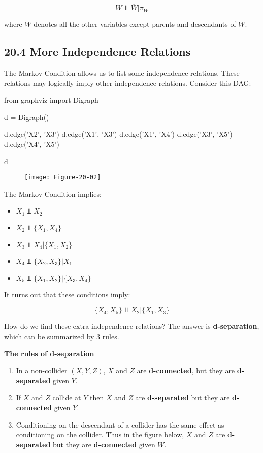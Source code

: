 \[W \text{ ⫫ } \overline{W} | \pi_W \]

where \(\overline{W}\) denotes all the other variables except parents
and descendants of \(W\).

\subsection*{20.4 More Independence Relations}\label{more-independence-relations}

The Markov Condition allows us to list some independence relations.
These relations may logically imply other independence relations.
Consider this DAG:

\begin{python}
from graphviz import Digraph

d = Digraph()

d.edge('X2', 'X3')
d.edge('X1', 'X3')
d.edge('X1', 'X4')
d.edge('X3', 'X5')
d.edge('X4', 'X5')

d
\end{python}
 
\begin{figure}[H]
\centering
\texttt{[image: Figure-20-02]}
\end{figure}


The Markov Condition implies:

\begin{itemize}[tightlist]
\item
  \(X_{1} \text{ ⫫ } X_{2}\)
\item
  \(X_{2} \text{ ⫫ } \{ X_{1}, X_{4} \}\)
\item
  \(X_{3} \text{ ⫫ } X_{4} | \{ X_{1}, X_{2} \}\)
\item
  \(X_{4} \text{ ⫫ } \{ X_{2}, X_{3} \} | X_{1}\)
\item
  \(X_{5} \text{ ⫫ } \{ X_{1}, X_{2} \} | \{X_{3}, X_{4}\}\)
\end{itemize}

It turns out that these conditions imply:

\[ \{ X_{4}, X_{5} \} \text{ ⫫ } X_{2} | \{ X_{1}, X_{3} \} \]

How do we find these extra independence relations? The answer is
\textbf{d-separation}, which can be summarized by 3 rules.

\textbf{The rules of d-separation}

\begin{enumerate}[tightlist,label={\arabic*.}]
\item
  In a non-collider \((X, Y, Z)\), \(X\) and \(Z\) are
  \textbf{d-connected}, but they are \textbf{d-separated} given \(Y\).
\item
  If \(X\) and \(Z\) collide at \(Y\) then \(X\) and \(Z\) are
  \textbf{d-separated} but they are \textbf{d-connected} given \(Y\).
\item
  Conditioning on the descendant of a collider has the same effect as
  conditioning on the collider. Thus in the figure below, \(X\) and
  \(Z\) are \textbf{d-separated} but they are \textbf{d-connected} given
  \(W\).
\end{enumerate}

